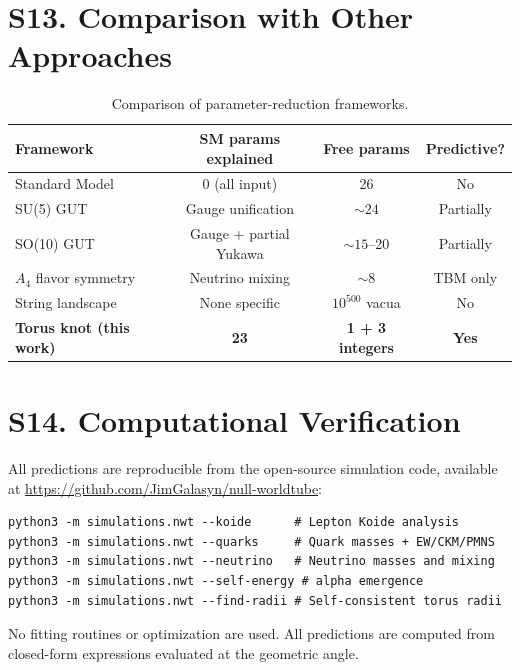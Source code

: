 \documentclass[11pt,a4paper]{article}
\begin{document}
\section{S13. Comparison with Other Approaches}
\label{sec:S13}

\begin{table}[h]
\centering
\begin{tabular}{@{}lccc@{}}
\toprule
Framework & SM params explained & Free params & Predictive? \\
\midrule
Standard Model & 0 (all input) & 26 & No \\
SU(5) GUT~\cite{georgi1974} & Gauge unification & ${\sim}24$ & Partially \\
SO(10) GUT & Gauge + partial Yukawa & ${\sim}15$--20 & Partially \\
$A_4$ flavor symmetry~\cite{ma2001} & Neutrino mixing & ${\sim}8$ & TBM only \\
String landscape~\cite{bousso2000} & None specific & $10^{500}$ vacua & No \\
\textbf{Torus knot (this work)} & \textbf{23} & \textbf{1 + 3 integers} & \textbf{Yes} \\
\bottomrule
\end{tabular}
\caption{Comparison of parameter-reduction frameworks.}
\label{tab:comparison}
\end{table}

\section{S14. Computational Verification}
\label{sec:S14}

All predictions are reproducible from the open-source simulation code, available at \url{https://github.com/JimGalasyn/null-worldtube}:
\begin{verbatim}
python3 -m simulations.nwt --koide      # Lepton Koide analysis
python3 -m simulations.nwt --quarks     # Quark masses + EW/CKM/PMNS
python3 -m simulations.nwt --neutrino   # Neutrino masses and mixing
python3 -m simulations.nwt --self-energy # alpha emergence
python3 -m simulations.nwt --find-radii # Self-consistent torus radii
\end{verbatim}

No fitting routines or optimization are used. All predictions are computed from closed-form expressions evaluated at the geometric angle.
\end{document}
